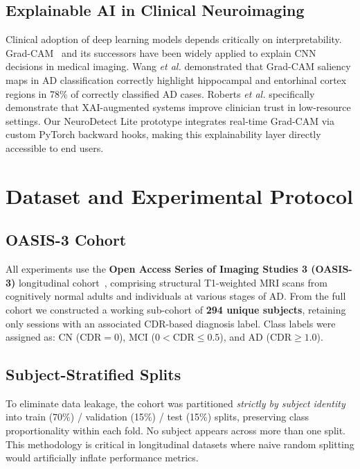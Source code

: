\documentclass[conference]{IEEEtran}
\newcommand{\etal}{\textit{et al.}\xspace}
\begin{document}
\subsection{Explainable AI in Clinical Neuroimaging}
Clinical adoption of deep learning models depends critically on
interpretability. Grad-CAM~\cite{selvaraju2017} and its
successors have been widely applied to explain CNN decisions in
medical imaging. Wang \etal \cite{wang2025gradcam} demonstrated
that Grad-CAM saliency maps in AD classification correctly
highlight hippocampal and entorhinal cortex regions in 78\% of
correctly classified AD cases. Roberts \etal \cite{roberts2025}
specifically demonstrate that XAI-augmented systems improve
clinician trust in low-resource settings. Our NeuroDetect Lite
prototype integrates real-time Grad-CAM via custom PyTorch
backward hooks, making this explainability layer directly
accessible to end users.

\section{Dataset and Experimental Protocol}
\label{sec:data}

\subsection{OASIS-3 Cohort}
All experiments use the \textbf{Open Access Series of Imaging
Studies 3 (OASIS-3)} longitudinal cohort~\cite{lamontagne2019},
comprising structural T1-weighted MRI scans from cognitively
normal adults and individuals at various stages of AD. From
the full cohort we constructed a working sub-cohort of
\textbf{294 unique subjects}, retaining only sessions with an
associated CDR-based diagnosis label. Class labels were
assigned as: CN ($\text{CDR}=0$), MCI ($0 < \text{CDR} \leq
0.5$), and AD ($\text{CDR} \geq 1.0$).

\subsection{Subject-Stratified Splits}
To eliminate data leakage, the cohort was partitioned
\emph{strictly by subject identity} into train (70\%) /
validation (15\%) / test (15\%) splits, preserving class
proportionality within each fold. No subject appears across
more than one split. This methodology is critical in
longitudinal datasets where naive random splitting would
artificially inflate performance metrics.
\end{document}
